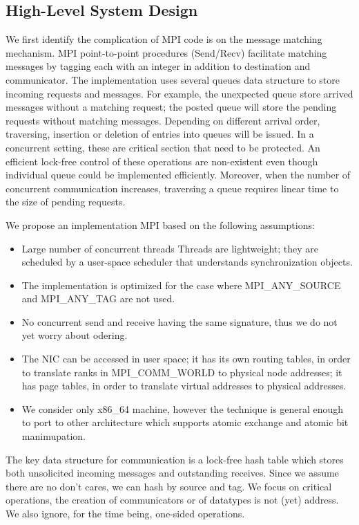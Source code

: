 \subsection{High-Level System Design}
We first identify the complication of MPI code is on the message matching
mechanism. MPI point-to-point procedures (Send/Recv) facilitate matching
messages by tagging each with an integer in addition to destination and
communicator. The implementation uses several queues data structure to store
incoming requests and messages. For example, the unexpected queue store arrived
messages without a matching request; the posted queue will store the pending
requests without matching messages. Depending on different arrival order,
traversing, insertion or deletion of entries into queues will be issued. In a
concurrent setting, these are critical section that need to be protected. An
efficient lock-free control of these operations are non-existent even though
individual queue could be implemented efficiently.  Moreover, when the number
of concurrent communication increases, traversing a queue requires linear time
to the size of pending requests.

We propose an implementation MPI based on the following assumptions:
\begin{itemize}
  \item Large number of concurrent threads Threads are lightweight; they are
    scheduled by a user-space scheduler that understands synchronization
    objects.
  \item The implementation is optimized for the case where MPI_ANY_SOURCE and MPI_ANY_TAG are not used.
  \item No concurrent send and receive having the same signature, thus we do not yet worry about odering.
  \item The NIC can be accessed in user space; it has its own routing tables,
    in order to translate ranks in MPI\_COMM\_WORLD to physical node addresses;
    it has page tables, in order to translate virtual addresses to physical
    addresses.
  \item We consider only x86_64 machine, however the technique is general
    enough to port to other architecture which supports atomic exchange and
    atomic bit manimupation.
\end{itemize}

The key data structure for communication is a lock-free hash table which stores
both unsolicited incoming messages and outstanding receives. Since we assume
there are no don't cares, we can hash by source and tag. We focus on critical
operations, the creation of communicators or of datatypes is not (yet)
address. We also ignore, for the time being, one-sided operations.

